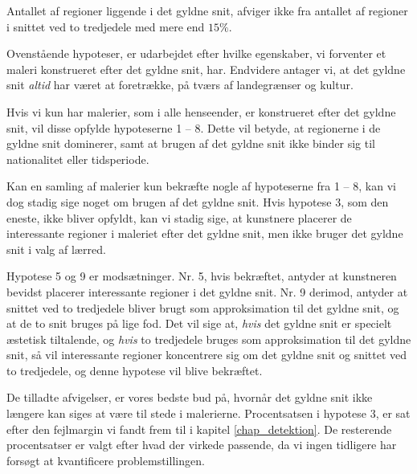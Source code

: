 {\begin{hypotese}
    Antallet af regioner liggende i det gyldne snit, afviger ikke fra
    antallet af regioner i snittet ved to tredjedele med mere end
    $15\%$.
    \label{hypo_15p}
\end{hypotese}

Ovenstående hypoteser, er udarbejdet efter hvilke egenskaber, vi
forventer et maleri konstrueret efter det gyldne snit, har. Endvidere
antager vi, at det gyldne snit \emph{altid} har været at foretrække, på
tværs af landegrænser og kultur.

Hvis vi kun har malerier, som i alle henseender, er konstrueret efter det
gyldne snit, vil disse opfylde hypoteserne 1 -- 8. Dette vil betyde, at
regionerne i de gyldne snit dominerer, samt at brugen af det gyldne snit
ikke binder sig til nationalitet eller tidsperiode.

Kan en samling af malerier kun bekræfte nogle af hypoteserne fra 1 -- 8,
kan vi dog stadig sige noget om brugen af det gyldne snit. Hvis hypotese
3, som den eneste, ikke bliver opfyldt, kan vi stadig sige, at kunstnere
placerer de interessante regioner i maleriet efter det gyldne snit, men
ikke bruger det gyldne snit i valg af lærred.

Hypotese 5 og 9 er modsætninger. Nr. 5, hvis bekræftet, antyder at
kunstneren bevidst placerer interessante regioner i det gyldne snit. Nr.
9 derimod, antyder at snittet ved to tredjedele bliver brugt som
approksimation til det gyldne snit, og at de to snit bruges på lige fod.
Det vil sige at, \emph{hvis} det gyldne snit er specielt æstetisk
tiltalende, og \emph{hvis} to tredjedele bruges som approksimation til
det gyldne snit, så vil interessante regioner koncentrere sig om det
gyldne snit og snittet ved to tredjedele, og denne hypotese vil blive
bekræftet.

De tilladte afvigelser, er vores bedste bud på, hvornår det gyldne snit
ikke længere kan siges at være til stede i malerierne. Procentsatsen i
hypotese 3, er sat efter den fejlmargin vi fandt frem til i kapitel
\ref{chap_detektion}. De resterende procentsatser er valgt efter hvad
der virkede passende, da vi ingen tidligere har forsøgt at kvantificere
problemstillingen.

}
